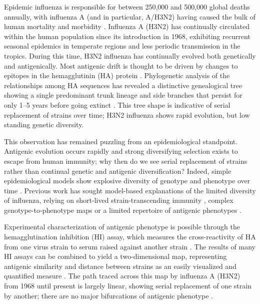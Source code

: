 \documentclass[11pt,oneside,letterpaper]{article}
\begin{document}
Epidemic influenza is responsible for between 250,000 and 500,000 global deaths annually, with influenza A (and in particular, A/H3N2) having caused the bulk of human mortality and morbidity \cite{flufactsheet}.  Influenza A (H3N2) has continually circulated within the human population since its introduction in 1968, exhibiting recurrent seasonal epidemics in temperate regions and less periodic transmission in the tropics.  During this time, H3N2 influenza has continually evolved both genetically and antigenically.  Most antigenic drift is thought to be driven by changes to epitopes in the hemagglutinin (HA) protein \cite{Nelson07NatRevGenet}.  Phylogenetic analysis of the relationships among HA sequences has revealed a distinctive genealogical tree showing a single predominant trunk lineage and side branches that persist for only 1--5 years before going extinct \cite{Fitch97}.  This tree shape is indicative of serial replacement of strains over time; H3N2 influenza shows rapid evolution, but low standing genetic diversity.

This observation has remained puzzling from an epidemiological standpoint.  Antigenic evolution occurs rapidly and strong diversifying selection exists to escape from human immunity; why then do we see serial replacement of strains rather than continual genetic and antigenic diversification?  Indeed, simple epidemiological models show explosive diversity of genotype and phenotype over time \cite{Ferguson03,Tria05}.  Previous work has sought model-based explanations of the limited diversity of influenza, relying on short-lived strain-transcending immunity \cite{Ferguson03,Tria05}, complex genotype-to-phenotype maps \cite{Koelle06} or a limited repertoire of antigenic phenotypes \cite{Recker07}. 

Experimental characterization of antigenic phenotype is possible through the hemagglutination inhibition (HI) assay, which measures the cross-reactivity of HA from one virus strain to serum raised against another strain \cite{Hirst43}.  The results of many HI assays can be combined to yield a two-dimensional map, representing antigenic similarity and distance between strains as an easily visualized and quantified measure \cite{Smith04}.  The path traced across this map by influenza A (H3N2) from 1968 until present is largely linear, showing serial replacement of one strain by another; there are no major bifurcations of antigenic phenotype \cite{Smith04}.
\end{document}
